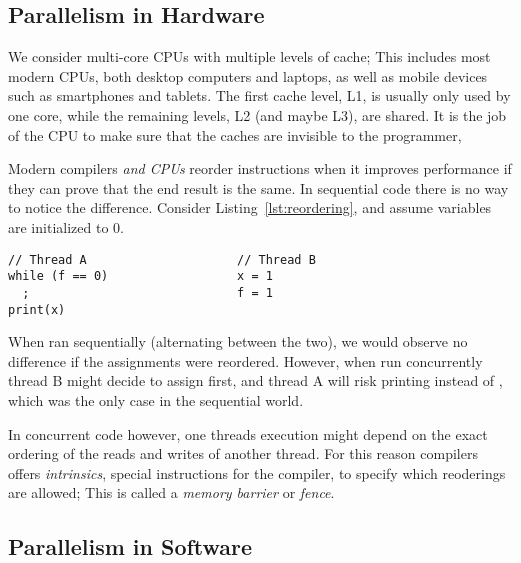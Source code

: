 \documentclass[a4paper,twoside]{article}
\begin{document}



\subsection{Parallelism in Hardware}
We consider multi-core CPUs with multiple levels of cache;
This includes most modern CPUs, both desktop computers and laptops,
as well as mobile devices such as smartphones and tablets.
The first cache level, L1, is usually only used by one core,
while the remaining levels, L2 (and maybe L3), are shared.
It is the job of the CPU to make sure that the caches are
invisible to the programmer, 

Modern compilers \emph{and CPUs} reorder instructions when it improves
performance if they can prove that the end result is the same.
In sequential code there is no way to notice the difference.
Consider Listing~\ref{lst:reordering}, and assume variables
are initialized to 0.
\begin{lstlisting}[caption=Instruction reordering,label=lst:reordering]
// Thread A                     // Thread B
while (f == 0)                  x = 1
  ;                             f = 1
print(x)
\end{lstlisting}
When ran sequentially (alternating between the two), we would observe
no difference if the assignments were reordered. However, when run
concurrently thread B might decide to assign  first,
and thread A will risk printing  instead of ,
which was the only case in the sequential world.

In concurrent code however, one threads execution might depend
on the exact ordering of the reads and writes of another thread.
For this reason compilers offers \emph{intrinsics},
special instructions for the compiler, to specify which reoderings are allowed;
This is called a \emph{memory barrier} or \emph{fence}.




\subsection{Parallelism in Software}
\end{document}
